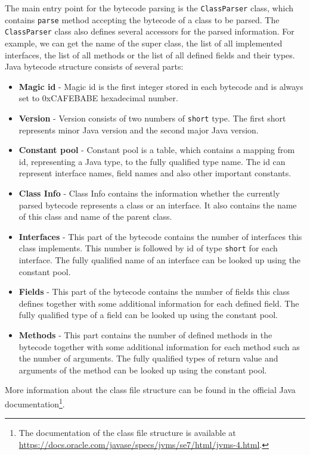 The main entry point for the bytecode parsing is the \texttt{ClassParser} class, which contains \texttt{parse} method accepting the bytecode of a class to be parsed. The \texttt{ClassParser} class also defines several accessors for the parsed information. For example, we can get the name of the super class, the list of all implemented interfaces, the list of all methods or the list of all defined fields and their types. Java bytecode structure consists of several parts:
\begin{itemize}
	\item \textbf{Magic id} - Magic id is the first integer stored in each bytecode and is always set to 0xCAFEBABE hexadecimal number.
	\item \textbf{Version} - Version consists of two numbers of \texttt{short} type. The first short represents minor Java version and the second major Java version.
	\item \textbf{Constant pool} - Constant pool is a table, which contains a mapping from id, representing a Java type, to the fully qualified type name. The id can represent interface names, field names and also other important constants.
	\item \textbf{Class Info} - Class Info contains the information whether the currently parsed bytecode represents a class or an interface. It also contains the name of this class and name of the parent class.
	\item \textbf{Interfaces} - This part of the bytecode contains the number of interfaces this class implements. This number is followed by id of type \texttt{short} for each interface. The fully qualified name of an interface can be looked up using the constant pool.
	\item \textbf{Fields} - This part of the bytecode contains the number of fields this class defines together with some additional information for each defined field. The fully qualified type of a field can be looked up using the constant pool.
	\item \textbf{Methods} - This part contains the number of defined methods in the bytecode together with some additional information for each method such as the number of arguments. The fully qualified types of return value and arguments of the method can be looked up using the constant pool.
\end{itemize}
More information about the class file structure can be found in the official Java documentation\footnote{The documentation of the class file structure is available at \url{https://docs.oracle.com/javase/specs/jvms/se7/html/jvms-4.html}.}.
